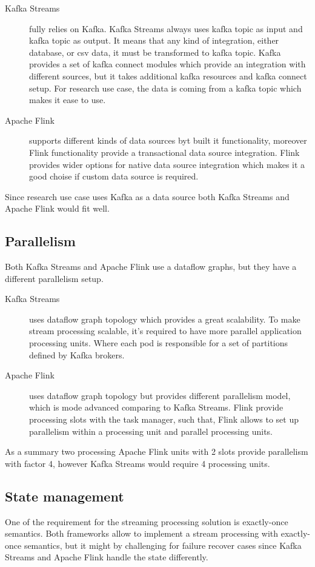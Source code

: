 \begin{description}
    \item[Kafka Streams] fully relies on Kafka.
    Kafka Streams always uses kafka topic as input and kafka topic as output.
    It means that any kind of integration, either database, or csv data, it must
    be transformed to kafka topic.
    Kafka provides a set of kafka connect modules which provide an integration with
    different sources, but it takes additional kafka resources and kafka connect setup.
    For research use case, the data is coming from a kafka topic which makes it ease to use.
    \item[Apache Flink] supports different kinds of data sources byt built it functionality,
    moreover Flink functionality provide a transactional data source integration.
    Flink provides wider options for native data source integration which makes it
    a good choise if custom data source is required.
\end{description}

Since research use case uses Kafka as a data source both
Kafka Streams and Apache Flink would fit well.


\subsection{Parallelism}\label{subsec:topology}
Both Kafka Streams and Apache Flink use a dataflow graphs, but they
have a different parallelism setup.

\begin{description}
    \item[Kafka Streams] uses dataflow graph topology which provides a great scalability.
    To make stream processing scalable, it's required to have more parallel application
    processing units.
    Where each pod is responsible for a set of partitions defined by Kafka brokers.
    \item[Apache Flink] uses dataflow graph topology but provides different
    parallelism model, which is mode advanced comparing to Kafka Streams.
    Flink provide processing slots with the task manager, such that, Flink
    allows to set up parallelism within a processing unit and parallel processing units.
\end{description}

As a summary two processing Apache Flink units with 2 slots provide parallelism with factor 4,
however Kafka Streams would require 4 processing units.

\subsection{State management}\label{subsec:state-management}
One of the requirement for the streaming processing solution is exactly-once semantics.
Both frameworks allow to implement a stream processing with exactly-once semantics,
but it might by challenging for failure recover cases since Kafka Streams and
Apache Flink handle the state differently.

